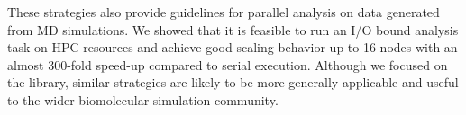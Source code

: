 
%

These strategies also provide guidelines for parallel analysis on data generated from MD simulations.
We showed that it is feasible to run an I/O bound analysis task on HPC resources and achieve good scaling behavior up to 16 nodes with an almost 300-fold speed-up compared to serial execution.
Although we focused on the  library, similar strategies are likely to be more generally applicable and useful to the wider biomolecular simulation community.


